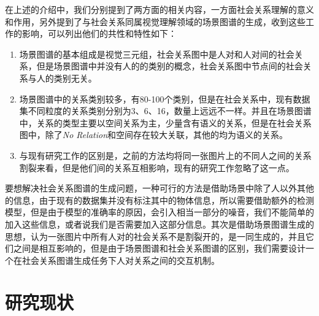 在上述的介绍中，我们分别提到了两方面的相关内容，一方面社会关系理解的意义和作用，另外提到了与社会关系同属视觉理解领域的场景图谱的生成，收到这些工作的影响，可以列出他们的共性和特性如下：
\begin{enumerate}
    \item 场景图谱的基本组成是视觉三元组，社会关系图中是人对和人对间的社会关系，但是场景图谱中并没有人的的类别的概念，社会关系图中节点间的社会关系与人的类别无关。
    \item 场景图谱中的关系类别较多，有80-100个类别，但是在社会关系中，现有数据集不同粒度的关系类别分别为3、6、16，数量上远远不一样。并且在场景图谱中，关系的类型主要以空间关系为主，少量含有语义的关系，但是在社会关系图中，除了{\it No Relation}和空间存在较大关联，其他的均为语义的关系。
    \item 与现有研究工作的区别是，之前的方法均将同一张图片上的不同人之间的关系割裂来看，但是他们间的关系互相影响，现有的研究工作忽略了这一点。
\end{enumerate}

要想解决社会关系图谱的生成问题，一种可行的方法是借助场景中除了人以外其他的信息，由于现有的数据集并没有标注其中的物体信息，所以需要借助额外的检测模型，但是由于模型的准确率的原因，会引入相当一部分的噪音，我们不能简单的加入这些信息，或者说我们是否需要加入这部分信息。其次是借助场景图谱生成的思想，认为一张图片中所有人对的社会关系不是割裂开的，是一同生成的，并且它们之间是相互影响的，但是由于场景图谱和社会关系图谱的区别，我们需要设计一个在社会关系图谱生成任务下人对关系之间的交互机制。

\section{研究现状}


